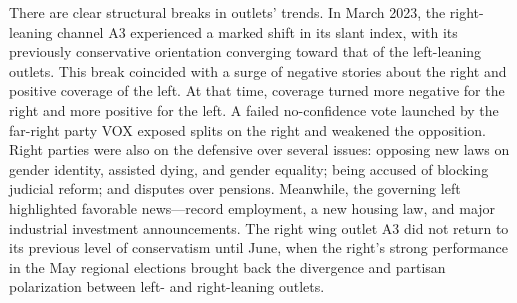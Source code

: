\documentclass[12pt]{article}
\begin{document}


There are clear structural breaks in outlets’ trends. In March 2023, the right-leaning channel A3 experienced a marked shift in its slant index, with its previously conservative orientation converging toward that of the left-leaning outlets. This break coincided with a surge of negative stories about the right and positive coverage of the left. At that time, coverage turned more negative for the right and more positive for the left. A failed no-confidence vote launched by the far-right party VOX exposed splits on the right and weakened the opposition. Right parties were also on the defensive over several issues: opposing new laws on gender identity, assisted dying, and gender equality; being accused of blocking judicial reform; and disputes over pensions. Meanwhile, the governing left highlighted favorable news—record employment, a new housing law, and major industrial investment announcements. The right wing outlet A3 did not return to its previous level of conservatism until June, when the right’s strong performance in the May regional elections brought back the  divergence and partisan polarization between left- and right-leaning outlets. 
\end{document}

